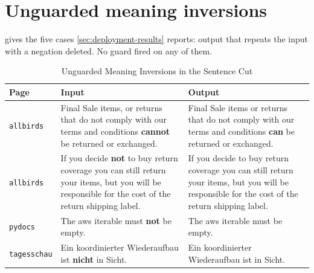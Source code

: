 \section{Unguarded meaning inversions}
\label{app:inversions}

 gives the five cases \cref{sec:deployment-results} reports: output that repeats the input with a negation deleted.
No guard fired on any of them.

\begin{table}[htbp]
	\centering
	\footnotesize
	\setlength{\tabcolsep}{5pt}
	\caption{Unguarded Meaning Inversions in the Sentence Cut}
	\label{tab:inversions}
	\begin{tabular}{@{}lP{5.2cm}P{5.0cm}@{}}
		\toprule
		\textbf{Page}       & \textbf{Input}                                                                                                                                            & \textbf{Output}                                                                                                                              \\
		\midrule
		\texttt{allbirds}   & Final Sale items, or returns that do not comply with our terms and conditions \textbf{cannot} be returned or exchanged.                                   & Final Sale items or returns that do not comply with our terms and conditions \textbf{can} be returned or exchanged.                          \\
		\addlinespace
		\texttt{allbirds}   & If you decide \textbf{not} to buy return coverage you can still return your items, but you will be responsible for the cost of the return shipping label. & If you decide to buy return coverage you can still return your items, but you will be responsible for the cost of the return shipping label. \\
		\addlinespace
		\texttt{pydocs}     & The aws iterable must \textbf{not} be empty.                                                                                                              & The aws iterable must be empty.                                                                                                              \\
		\addlinespace
		\texttt{tagesschau} & Ein koordinierter Wiederaufbau ist \textbf{nicht} in Sicht.                                                                                               & Ein koordinierter Wiederaufbau ist in Sicht.                                                                                                 \\

\end{tabular}
\end{table}
